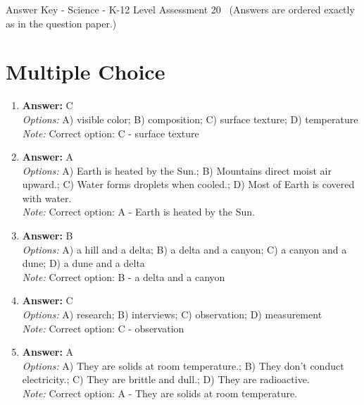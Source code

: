 \documentclass[12pt]{article}
\begin{document}
\begin{center}
Answer Key - Science - K-12 Level Assessment 20 \
\small (Answers are ordered exactly as in the question paper.)
\end{center}

\section*{Multiple Choice}
\begin{enumerate}[label=\arabic*.]
\item \textbf{Answer:} C
\\ \textit{Options:} A) visible color; B) composition; C) surface texture; D) temperature
\\ \textit{Note:} Correct option: C - surface texture
\item \textbf{Answer:} A
\\ \textit{Options:} A) Earth is heated by the Sun.; B) Mountains direct moist air upward.; C) Water forms droplets when cooled.; D) Most of Earth is covered with water.
\\ \textit{Note:} Correct option: A - Earth is heated by the Sun.
\item \textbf{Answer:} B
\\ \textit{Options:} A) a hill and a delta; B) a delta and a canyon; C) a canyon and a dune; D) a dune and a delta
\\ \textit{Note:} Correct option: B - a delta and a canyon
\item \textbf{Answer:} C
\\ \textit{Options:} A) research; B) interviews; C) observation; D) measurement
\\ \textit{Note:} Correct option: C - observation
\item \textbf{Answer:} A
\\ \textit{Options:} A) They are solids at room temperature.; B) They don't conduct electricity.; C) They are brittle and dull.; D) They are radioactive.
\\ \textit{Note:} Correct option: A - They are solids at room temperature.
\end{enumerate}
\end{document}
